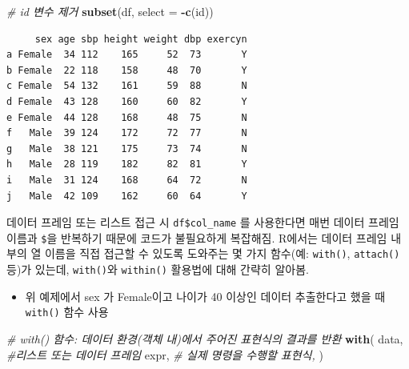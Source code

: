 \documentclass[
  11pt,
]{krantz}
\newenvironment{Shaded}{\begin{snugshade}}{\end{snugshade}}
\newcommand{\CommentTok}[1]{\textcolor[rgb]{0.37,0.37,0.37}{\textit{#1}}}
\newcommand{\DataTypeTok}[1]{\textcolor[rgb]{0.27,0.27,0.27}{#1}}
\newcommand{\KeywordTok}[1]{\textcolor[rgb]{0.27,0.27,0.27}{\textbf{#1}}}
\newcommand{\NormalTok}[1]{#1}
\newcommand{\OperatorTok}[1]{\textcolor[rgb]{0.43,0.43,0.43}{\textbf{#1}}}
\providecommand{\tightlist}{%
  \setlength{\itemsep}{0pt}\setlength{\parskip}{0pt}}
\let\BeginKnitrBlock\begin \let\EndKnitrBlock\end
\begin{document}
\begin{Shaded}
\begin{Highlighting}[]
\CommentTok{# id 변수 제거}
\KeywordTok{subset}\NormalTok{(df, }\DataTypeTok{select =} \OperatorTok{-}\KeywordTok{c}\NormalTok{(id))}
\end{Highlighting}
\end{Shaded}

\begin{verbatim}
     sex age sbp height weight dbp exercyn
a Female  34 112    165     52  73       Y
b Female  22 118    158     48  70       Y
c Female  54 132    161     59  88       N
d Female  43 128    160     60  82       Y
e Female  44 128    168     48  75       N
f   Male  39 124    172     72  77       N
g   Male  38 121    175     73  74       N
h   Male  28 119    182     82  81       Y
i   Male  31 124    168     64  72       N
j   Male  42 109    162     60  64       Y
\end{verbatim}

\normalsize

\footnotesize

\BeginKnitrBlock{rmdnote}
데이터 프레임 또는 리스트 접근 시 \texttt{df\$col\_name} 를 사용한다면 매번 데이터 프레임 이름과 \texttt{\$}을 반복하기 때문에 코드가 불필요하게 복잡해짐. R에서는 데이터 프레임 내부의 열 이름을 직접 접근할 수 있도록 도와주는 몇 가지 함수(예: \texttt{with()}, \texttt{attach()} 등)가 있는데, \texttt{with()}와 \texttt{within()} 활용법에 대해 간략히 알아봄.
\EndKnitrBlock{rmdnote}

\normalsize

\begin{itemize}
\tightlist
\item
  위 예제에서 sex 가 Female이고 나이가 40 이상인 데이터 추출한다고 했을 때 \texttt{with()} 함수 사용
\end{itemize}

\footnotesize

\begin{Shaded}
\begin{Highlighting}[]
\CommentTok{# with() 함수: 데이터 환경(객체 내)에서 주어진 표현식의 결과를 반환}
\KeywordTok{with}\NormalTok{(}
\NormalTok{  data, }\CommentTok{#리스트 또는 데이터 프레임}
\NormalTok{  expr, }\CommentTok{# 실제 명령을 수행할 표현식, }
\NormalTok{)}
\end{Highlighting}
\end{Shaded}

\normalsize

\footnotesize
\end{document}
